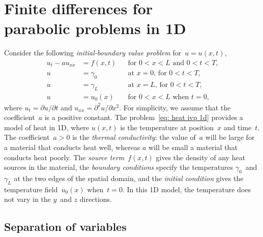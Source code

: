 \chapter[Finite differences for parabolic problems]{Finite differences for \\
parabolic problems in 1D}
Consider the following \emph{initial-boundary value problem} for~$u=u(x,t)$,
\begin{equation}\label{eq: heat ivp 1d}
\begin{aligned}
u_t-au_{xx}&=f(x,t)&&\text{for $0<x<L$ and $0<t<T$,}\\
u&=\gamma_0&&\text{at $x=0$, for $0<t<T$,}\\
u&=\gamma_L&&\text{at $x=L$, for $0<t<T$,}\\
u&=u_0(x)&&\text{for $0<x<L$ when $t=0$,}
\end{aligned}
\end{equation}
where $u_t=\partial u/\partial t$ and $u_{xx}=\partial^2u/\partial x^2$.  For 
simplicity, we assume that the coefficient~$a$ is a positive constant.  The 
problem~\eqref{eq: heat ivp 1d} provides a model of heat in 1D, where $u(x,t)$ 
is the temperature at position~$x$ and time~$t$.  The coefficient~$a>0$ 
is the \emph{thermal conductivity}: the value of~$a$ will be large for a 
material that conducts heat well, whereas $a$ will be small a material that 
conducts heat poorly.  The \emph{source term}~$f(x,t)$ gives the density of any 
heat sources in the material, the \emph{boundary conditions} specify the 
temperatures $\gamma_0$~and $\gamma_L$ at the two edges of the spatial domain, 
and the \emph{initial condition} gives the temperature field~$u_0(x)$ 
when~$t=0$.  In this 1D model, the temperature does not vary in the $y$~and $z$ 
directions.

\section{Separation of variables}

